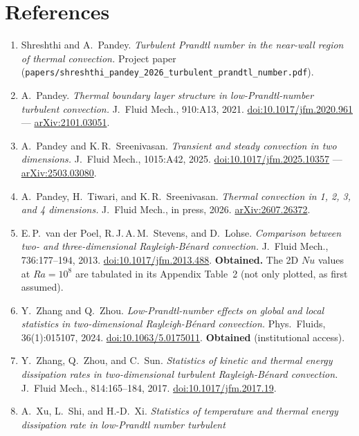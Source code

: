 \documentclass[11pt]{article}
\begin{document}
\section*{References}
\begin{enumerate}[leftmargin=1.6em, itemsep=0.6em]
\item Shreshthi and A.\ Pandey. \emph{Turbulent Prandtl number in the
near-wall region of thermal convection.} Project paper (\texttt{papers/shreshthi\_pandey\_2026\_turbulent\_prandtl\_number.pdf}).
\item A.\ Pandey. \emph{Thermal boundary layer structure in
low-Prandtl-number turbulent convection.} J.\ Fluid Mech., 910:A13, 2021.
\href{https://doi.org/10.1017/jfm.2020.961}{doi:10.1017/jfm.2020.961} ---
\href{https://arxiv.org/abs/2101.03051}{arXiv:2101.03051}.
\item A.\ Pandey and K.\,R.\ Sreenivasan. \emph{Transient and steady
convection in two dimensions.} J.\ Fluid Mech., 1015:A42, 2025.
\href{https://doi.org/10.1017/jfm.2025.10357}{doi:10.1017/jfm.2025.10357} ---
\href{https://arxiv.org/abs/2503.03080}{arXiv:2503.03080}.
\item A.\ Pandey, H.\ Tiwari, and K.\,R.\ Sreenivasan. \emph{Thermal
convection in 1, 2, 3, and 4 dimensions.} J.\ Fluid Mech., in press, 2026.
\href{https://arxiv.org/abs/2607.26372}{arXiv:2607.26372}.
\item E.\,P.\ van der Poel, R.\,J.\,A.\,M.\ Stevens, and D.\ Lohse.
\emph{Comparison between two- and three-dimensional Rayleigh-B\'enard
convection.} J.\ Fluid Mech., 736:177--194, 2013.
\href{https://doi.org/10.1017/jfm.2013.488}{doi:10.1017/jfm.2013.488}.
\textbf{Obtained.} The 2D $Nu$ values at $Ra=10^8$ are tabulated in its
Appendix Table~2 (not only plotted, as first assumed).
\item Y.\ Zhang and Q.\ Zhou. \emph{Low-Prandtl-number effects on
global and local statistics in two-dimensional Rayleigh-B\'enard
convection.} Phys.\ Fluids, 36(1):015107, 2024.
\href{https://doi.org/10.1063/5.0175011}{doi:10.1063/5.0175011}.
\textbf{Obtained} (institutional access).
\item Y.\ Zhang, Q.\ Zhou, and C.\ Sun. \emph{Statistics of kinetic and
thermal energy dissipation rates in two-dimensional turbulent
Rayleigh-B\'enard convection.} J.\ Fluid Mech., 814:165--184, 2017.
\href{https://doi.org/10.1017/jfm.2017.19}{doi:10.1017/jfm.2017.19}.
\item A.\ Xu, L.\ Shi, and H.-D.\ Xi. \emph{Statistics of temperature
and thermal energy dissipation rate in low-Prandtl number turbulent
}
\end{enumerate}
\end{document}
